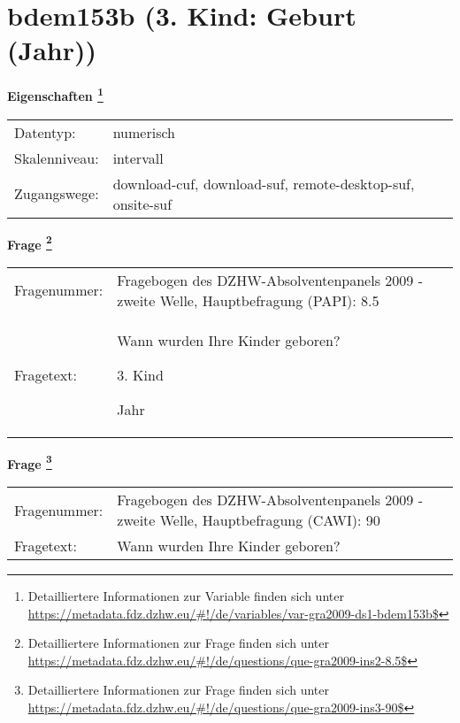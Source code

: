
    \setcounter{footnote}{0}

    \vspace*{-1.8cm}
	\section{bdem153b (3. Kind: Geburt (Jahr))}
	\label{section:bdem153b}



    \vspace*{0.5cm}
    \noindent\textbf{Eigenschaften
	\footnote{Detailliertere Informationen zur Variable finden sich unter
		\url{https://metadata.fdz.dzhw.eu/\#!/de/variables/var-gra2009-ds1-bdem153b$}}}\\
	\begin{tabularx}{\hsize}{@{}lX}
	Datentyp: & numerisch \\
	Skalenniveau: & intervall \\
	Zugangswege: &
	  download-cuf, 
	  download-suf, 
	  remote-desktop-suf, 
	  onsite-suf
 \\
    \end{tabularx}



				\vspace*{0.5cm}
                \noindent\textbf{Frage
	                \footnote{Detailliertere Informationen zur Frage finden sich unter
		              \url{https://metadata.fdz.dzhw.eu/\#!/de/questions/que-gra2009-ins2-8.5$}}}\\
				\begin{tabularx}{\hsize}{@{}lX}
					Fragenummer: &
					  Fragebogen des DZHW-Absolventenpanels 2009 - zweite Welle, Hauptbefragung (PAPI):
					  8.5
 \\
					Fragetext: & Wann wurden Ihre Kinder geboren?\par  3. Kind\par  Jahr \\
				\end{tabularx}
				\vspace*{0.5cm}
                \noindent\textbf{Frage
	                \footnote{Detailliertere Informationen zur Frage finden sich unter
		              \url{https://metadata.fdz.dzhw.eu/\#!/de/questions/que-gra2009-ins3-90$}}}\\
				\begin{tabularx}{\hsize}{@{}lX}
					Fragenummer: &
					  Fragebogen des DZHW-Absolventenpanels 2009 - zweite Welle, Hauptbefragung (CAWI):
					  90
 \\
					Fragetext: & Wann wurden Ihre Kinder geboren? \\
				\end{tabularx}





